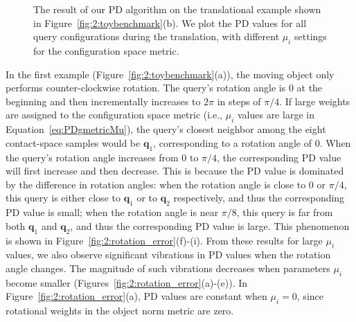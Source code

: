\begin{figure}[!h]
\caption[Configuration space metric's influence on the result of our PD algorithm: translational example]{The result of our PD algorithm on the translational example shown in Figure~\ref{fig:2:toybenchmark}(b). We plot the PD values for all query configurations during the translation, with different $\mu_i$ settings for the configuration space metric.}\label{fig:2:translation_error}
\end{figure}

In the first example (Figure~\ref{fig:2:toybenchmark}(a)), the moving object only performs counter-clockwise rotation. The query's rotation angle is $0$ at the beginning and then incrementally increases to $2\pi$ in steps of $\pi/4$. If large weights are assigned to the configuration space metric (i.e., $\mu_i$ values are large in Equation~\ref{eq:PDgmetricMu}), the query's closest neighbor among the eight contact-space samples would be $\mathbf q_1$, corresponding to a rotation angle of $0$. When the query's rotation angle increases from $0$ to $\pi/4$, the corresponding PD value will first increase and then decrease. This is because the PD value is dominated by the difference in rotation angles: when the rotation angle is close to $0$ or $\pi/4$, this query is either close to $\mathbf q_1$ or to $\mathbf q_2$ respectively, and thus the corresponding PD value is small; when the rotation angle is near $\pi/8$, this query is far from both $\mathbf q_1$ and $\mathbf q_2$, and thus the corresponding PD value is large. This phenomenon is shown in Figure~\ref{fig:2:rotation_error}(f)-(i). From these results for large $\mu_i$ values, we also observe significant vibrations in PD values when the rotation angle changes. The magnitude of such vibrations decreases when parameters $\mu_i$ become smaller (Figures~\ref{fig:2:rotation_error}(a)-(e)). In Figure~\ref{fig:2:rotation_error}(a), PD values are constant when $\mu_i = 0$, since rotational weights in the object norm metric are zero.

